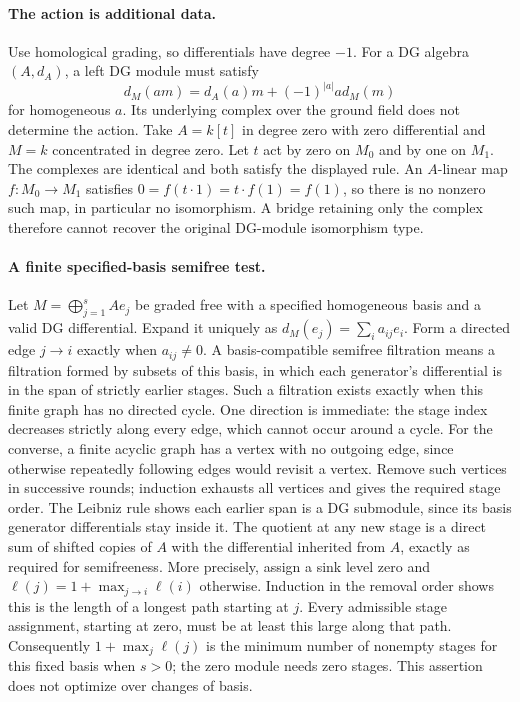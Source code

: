\documentclass[11pt]{article}
\begin{document}
\paragraph{The action is additional data.}
Use homological grading, so differentials have degree $-1$. For a DG algebra
$(A,d_A)$, a left DG module must satisfy
\[
d_M(am)=d_A(a)m+(-1)^{|a|}a d_M(m)
\]
for homogeneous $a$. Its underlying complex over the ground field does not
determine the action. Take $A=k[t]$ in degree zero with zero differential and
$M=k$ concentrated in degree zero. Let $t$ act by zero on $M_0$ and by one on
$M_1$. The complexes are identical and both satisfy the displayed rule.
An $A$-linear map $f:M_0\to M_1$ satisfies
$0=f(t\cdot1)=t\cdot f(1)=f(1)$, so there is no nonzero such map, in
particular no isomorphism. A bridge retaining only the complex therefore
cannot recover the original DG-module isomorphism type.

\paragraph{A finite specified-basis semifree test.}
Let $M=\bigoplus_{j=1}^s A e_j$ be graded free with a specified homogeneous
basis and a valid DG differential. Expand it uniquely as
$d_M(e_j)=\sum_i a_{ij}e_i$. Form a directed edge $j\to i$ exactly when
$a_{ij}\ne0$. A basis-compatible semifree filtration means a filtration
formed by subsets of this basis, in which each generator's differential is
in the span of strictly earlier stages. Such a filtration exists exactly
when this finite graph has no directed cycle.
One direction is immediate: the stage index decreases strictly along every
edge, which cannot occur around a cycle. For the converse, a finite acyclic
graph has a vertex with no outgoing edge, since otherwise repeatedly following
edges would revisit a vertex. Remove such vertices in successive rounds;
induction exhausts all vertices and gives the required stage order.
The Leibniz rule shows each earlier span is a DG submodule, since its basis
generator differentials stay inside it. The quotient at any new stage is a
direct sum of shifted copies of $A$ with the differential inherited from
$A$, exactly as required for semifreeness.
More precisely, assign a sink level zero and
$\ell(j)=1+\max_{j\to i}\ell(i)$ otherwise. Induction in the removal order
shows this is the length of a longest path starting at $j$. Every admissible
stage assignment, starting at zero, must be at least this large along that
path. Consequently $1+\max_j\ell(j)$ is the minimum number of nonempty
stages for this fixed basis when $s>0$; the zero module needs zero stages.
This assertion does not optimize over changes of basis.
\end{document}

